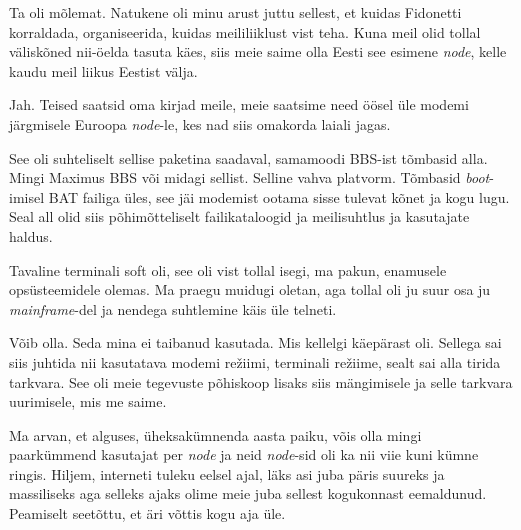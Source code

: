 Ta oli mõlemat. Natukene oli minu arust juttu  sellest, et kuidas Fidonetti  
korraldada, organiseerida, kuidas  meililiiklust vist teha. Kuna meil olid 
tollal väliskõned nii-öelda tasuta käes, siis meie saime olla Eesti  see 
esimene \emph{node}, kelle kaudu meil  liikus Eestist välja. 


Jah. Teised saatsid oma kirjad meile, meie saatsime need öösel üle 
modemi järgmisele Euroopa \emph{node}-le, kes nad siis  omakorda laiali jagas.
                 

See oli  suhteliselt sellise paketina saadaval, samamoodi BBS-ist tõmbasid 
alla. Mingi Maximus BBS või midagi sellist. Selline vahva platvorm. 
Tõmbasid \emph{boot}-imisel BAT failiga üles, see jäi modemist ootama sisse 
tulevat kõnet ja kogu lugu. Seal all olid siis põhimõtteliselt failikataloogid 
ja meilisuhtlus ja kasutajate haldus.


Tavaline terminali soft oli, see  oli vist tollal isegi, ma pakun, enamusele 
opsüsteemidele olemas. Ma praegu muidugi oletan, aga  tollal oli ju suur 
osa ju \emph{mainframe}-del ja nendega suhtlemine käis üle telneti.


Võib olla. Seda mina ei taibanud kasutada. Mis kellelgi käepärast oli. Sellega 
sai siis juhtida nii kasutatava modemi režiimi, terminali režiime, sealt sai 
alla tirida tarkvara. See oli meie tegevuste põhiskoop lisaks siis mängimisele 
ja selle tarkvara uurimisele, mis me saime.
                 

Ma arvan, et alguses, üheksakümnenda aasta paiku, võis olla mingi paarkümmend 
kasutajat per \emph{node} ja neid \emph{node}-sid oli ka nii viie kuni kümne 
ringis. Hiljem, interneti tuleku eelsel ajal, läks asi juba päris suureks ja 
massiliseks aga selleks ajaks olime meie juba sellest kogukonnast eemaldunud. 
Peamiselt seetõttu, et äri võttis kogu aja üle. 

